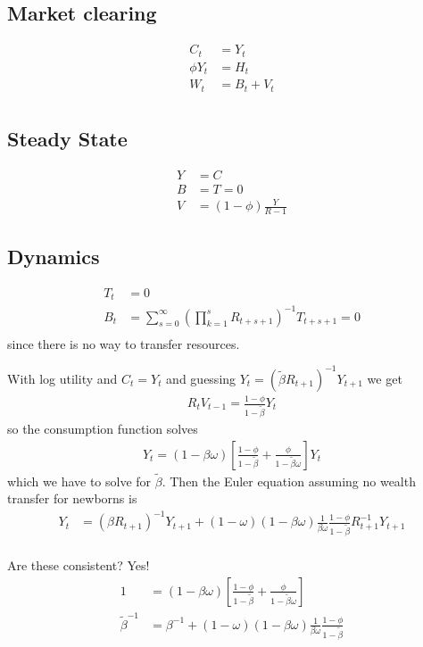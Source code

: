\documentclass[11pt]{article}
\begin{document}
\subsection{Market clearing}
\begin{align*}
    C_t &= Y_t \\
    \phi Y_t &=  H_t \\
    W_t &= B_t + V_t \\
\end{align*}

\subsection{Steady State}
\begin{align*}
    Y &= C \\
    B &= T = 0 \\
    V &= (1-\phi)\frac{Y}{R-1} 
\end{align*}

\subsection{Dynamics}
\begin{align*}
    T_t  &= 0 \\
    B_t &= \sum_{s=0}^{\infty}(\prod_{k=1}^{s}R_{t+s+1})^{-1}T_{t+s+1} = 0 \\
\end{align*}
since there is no way to transfer resources.

With log utility and $C_t=Y_t$ and guessing $Y_t=(\tilde{\beta}R_{t+1})^{-1}Y_{t+1}$
we get
\begin{align*}
    R_tV_{t-1} = \frac{1-\phi}{1-\tilde{\beta}}Y_t
\end{align*}
so the consumption function solves
\begin{align*}
    Y_t = (1-\beta\omega)\left[\frac{1-\phi}{1-\tilde{\beta}} + \frac{\phi}{1-\tilde{\beta}\omega} \right]Y_t
\end{align*}
which we have to solve for $\tilde{\beta}$. Then the Euler equation assuming no wealth transfer for newborns is
\begin{align*}
    Y_{t}&=(\beta R_{t+1})^{-1}Y_{t+1} + (1-\omega)(1-\beta\omega) \frac{1}{\beta\omega} \frac{1-\phi}{1-\tilde{\beta}} R_{t+1}^{-1}Y_{t+1} \\
\end{align*}

Are these consistent? Yes!
\begin{align*}
    1 &= (1-\beta\omega)\left[\frac{1-\phi}{1-\tilde{\beta}} + \frac{\phi}{1-\tilde{\beta}\omega} \right] \\
    \tilde{\beta}^{-1}&= \beta^{-1} + (1-\omega)(1-\beta\omega) \frac{1}{\beta\omega} \frac{1-\phi}{1-\tilde{\beta}} \\
\end{align*}
\end{document}
